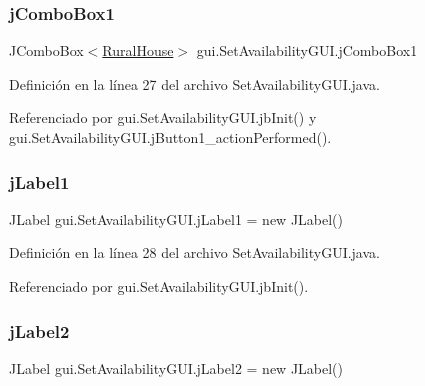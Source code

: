 \subsubsection{\texorpdfstring{jComboBox1}{jComboBox1}}
{\footnotesize\ttfamily J\+Combo\+Box$<$\mbox{\hyperlink{classdomain_1_1_rural_house}{Rural\+House}}$>$ gui.\+Set\+Availability\+G\+U\+I.\+j\+Combo\+Box1\hspace{0.3cm}{\ttfamily [private]}}



Definición en la línea 27 del archivo Set\+Availability\+G\+U\+I.\+java.



Referenciado por gui.\+Set\+Availability\+G\+U\+I.\+jb\+Init() y gui.\+Set\+Availability\+G\+U\+I.\+j\+Button1\+\_\+action\+Performed().

\mbox{\label{classgui_1_1_set_availability_g_u_i_a99e5f2918949b5f2a6efa15b7127efe0}} 
\subsubsection{\texorpdfstring{jLabel1}{jLabel1}}
{\footnotesize\ttfamily J\+Label gui.\+Set\+Availability\+G\+U\+I.\+j\+Label1 = new J\+Label()\hspace{0.3cm}{\ttfamily [private]}}



Definición en la línea 28 del archivo Set\+Availability\+G\+U\+I.\+java.



Referenciado por gui.\+Set\+Availability\+G\+U\+I.\+jb\+Init().

\mbox{\label{classgui_1_1_set_availability_g_u_i_a43fadd92c137066f726495f6de29a145}} 
\subsubsection{\texorpdfstring{jLabel2}{jLabel2}}
{\footnotesize\ttfamily J\+Label gui.\+Set\+Availability\+G\+U\+I.\+j\+Label2 = new J\+Label()\hspace{0.3cm}{\ttfamily [private]}}




